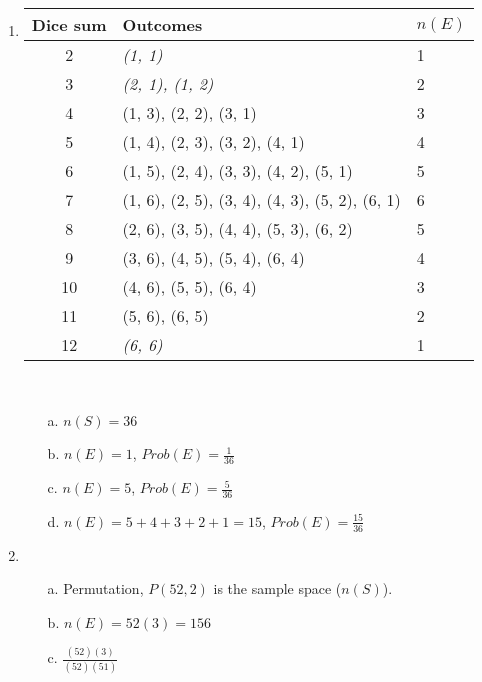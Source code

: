 {\begin{enumerate}
        \item   
            \begin{tabular}{c | p{8cm} | l }
                \textbf{Dice sum} & \textbf{Outcomes} & \textbf{$n(E)$} \\ \hline
                2 & \textit{(1, 1)}                                     & 1
                \\ \hline
                3 & \textit{(2, 1), (1, 2)}                             & 2
                \\ \hline
                4 & (1, 3), (2, 2), (3, 1)                              & 3
                \\ \hline
                5 & (1, 4), (2, 3), (3, 2), (4, 1)                      & 4
                \\ \hline
                6 & (1, 5), (2, 4), (3, 3), (4, 2), (5, 1)              & 5
                \\ \hline
                7 & (1, 6), (2, 5), (3, 4), (4, 3), (5, 2), (6, 1)      & 6
                \\ \hline
                8 & (2, 6), (3, 5), (4, 4), (5, 3), (6, 2)              & 5
                \\ \hline
                9 & (3, 6), (4, 5), (5, 4), (6, 4)                      & 4
                \\ \hline
                10 & (4, 6), (5, 5), (6, 4)                             & 3
                \\ \hline
                11 & (5, 6), (6, 5)                                     & 2
                \\ \hline
                12 & \textit{(6, 6)}                                    & 1
                \\ \hline
            \end{tabular} ~\\
            \begin{itemize}
                \item[a.]   $n(S) = 36$
                \item[b.]   $n(E) = 1$, $Prob(E) = \frac{1}{36}$
                \item[c.]   $n(E) = 5$, $Prob(E) = \frac{5}{36}$
                \item[d.]   $n(E) = 5 + 4 + 3 + 2 + 1 = 15$, $Prob(E) = \frac{15}{36}$
            \end{itemize}

        \item
            \begin{itemize}
                \item[a.]   Permutation, $P(52, 2)$ is the sample space ($n(S)$).
                \item[b.]   $n(E) = 52(3) = 156$
                \item[c.]   $\frac{(52)(3)}{(52)(51)}$
            \end{itemize}


\end{enumerate}}
